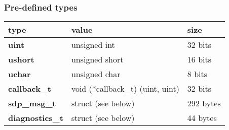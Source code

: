 \documentclass[11pt,a4paper,twoside]{article}
\begin{document}
\subsubsection{Pre-defined types}

\begin{center}
\renewcommand{\arraystretch}{1.2}
\begin{tabularx}{\textwidth}{| p{\fcw} X X |}
\hline
\textbf{type} & \textbf{value} & \textbf{size} \\%
\hline
\hline
\textbf{uint} & unsigned int & 32 bits \\%
\textbf{ushort} & unsigned short & 16 bits \\%
\textbf{uchar} & unsigned char & 8 bits \\%
\textbf{callback\_t} & {\small void (*callback\_t) (uint, uint)} & 32 bits \\%
\textbf{sdp\_msg\_t} & struct (see below) & 292 bytes \\%
\textbf{diagnostics\_t} & struct (see below) & 44 bytes \\%
\hline
\end{tabularx}
\end{center}
\end{document}
